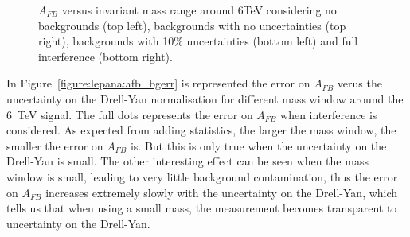 \begin{figure}[!htb]
  \caption{$A_{FB}$ versus invariant mass range around 6TeV considering no backgrounds (top left), backgrounds with no uncertainties (top right), backgrounds with 10\% uncertainties (bottom left) and full interference (bottom right).}
  \label{figure:lepana:afb_dm}
\end{figure}

\noindent In Figure~\ref{figure:lepana:afb_bgerr} is represented the error on $A_{FB}$ verus the uncertainty on the Drell-Yan normalisation for different mass window around the 6~TeV signal.
The full dots represents the error on $A_{FB}$ when interference is considered. As expected from adding statistics, the larger the mass window, the smaller the error on $A_{FB}$ is. But this is 
only true when the uncertainty on the Drell-Yan is small. The other interesting effect can be seen when the mass window is small, leading to very little background contamination, thus the error on 
$A_{FB}$ increases extremely slowly with the uncertainty on the Drell-Yan, which tells us that when using a small mass, the measurement becomes transparent to uncertainty on the Drell-Yan.



